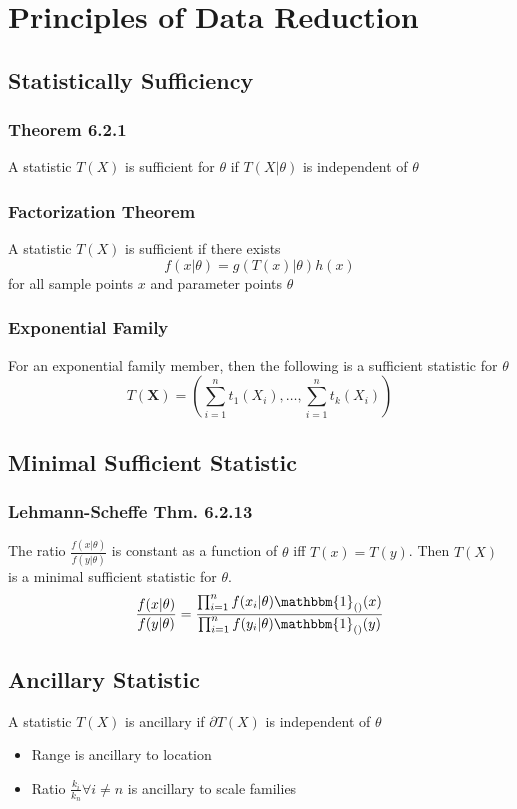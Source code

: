 \section{Principles of Data Reduction}
	\subsection{Statistically Sufficiency}
		\subsubsection*{Theorem 6.2.1}
			A statistic \(T(X)\) is sufficient for \(\theta\) if
			\(T(X|\theta)\) is independent of \(\theta\)
	
		\subsubsection*{Factorization Theorem}
			A statistic \(T(X)\) is sufficient if there exists
			\[ f(x|\theta) = g(T(x)|\theta)h(x) \]
			for all sample points \(x\)
			and parameter points \(\theta\)
		
		\subsubsection*{Exponential Family}
			For an exponential family member, then the following is a sufficient statistic for \(\theta\)
			\[T(\mathbf{X})=\left( \sum_{i=1}^n t_1(X_i),\ldots, \sum_{i=1}^n t_k(X_i) \right)\]
	
	\subsection{Minimal Sufficient Statistic}
		\subsubsection*{Lehmann-Scheffe Thm. 6.2.13}
			The ratio \(\frac{f(x|\theta)}{f(y|\theta)}\) is constant as a function of \(\theta\) iff \(T(x) = T(y)\). 
			Then \(T(X)\) is a minimal sufficient statistic for \(\theta\).
			\[\frac{f(x|\theta)}{f(y|\theta)} = \frac{\prod_{i=1}^nf(x_i|\theta)\mathbbm{1}_{()}(x)}{\prod_{i=1}^nf(y_i|\theta)\mathbbm{1}_{()}(y)}\]
	
	\subsection{Ancillary Statistic}
		A statistic \(T(X)\) is ancillary if
		\(\partial T(X)\) is independent of \(\theta\)
		\begin{itemize}
			\item Range is ancillary to location
			\item Ratio \(\frac{k_i}{k_n}\forall i\neq n\) is ancillary to scale families
		\end{itemize}
	
